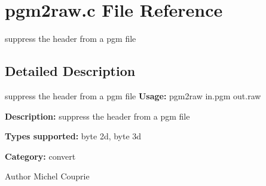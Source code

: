 \section{pgm2raw.c File Reference}
\label{pgm2raw_8c}


suppress the header from a pgm file  




\subsection{Detailed Description}
suppress the header from a pgm file {\bfseries Usage:} pgm2raw in.pgm out.raw

{\bfseries Description:} suppress the header from a pgm file

{\bfseries Types supported:} byte 2d, byte 3d

{\bfseries Category:} convert

\begin{DoxyAuthor}{Author}
Michel Couprie 
\end{DoxyAuthor}
